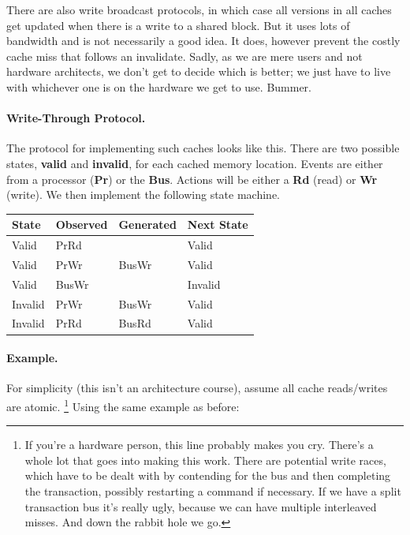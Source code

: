 \documentclass[a4paper]{report}
\begin{document}
There are also write broadcast protocols, in which case all versions in all caches get updated when there is a write to a shared block. But it uses lots of bandwidth and is not necessarily a good idea. It does, however prevent the costly cache miss that follows an invalidate. Sadly, as we are mere users and not hardware architects, we don't get to decide which is better; we just have to live with whichever one is on the hardware we get to use. Bummer.

\paragraph{Write-Through Protocol.}
The protocol for implementing such caches looks like this.
There are two possible states, {\bf valid} and {\bf invalid}, for each cached memory location.
Events are either from a processor ({\bf Pr}) or the {\bf Bus}. Actions will be either a \textbf{Rd} (read) or \textbf{Wr} (write).
We then implement the following state machine.

  \begin{center}
    \begin{tabular}{l|l|l|l}
      {\bf State} & {\bf Observed} & {\bf Generated} & {\bf Next State}\\ \hline
      Valid   & PrRd  &       & Valid\\
      Valid   & PrWr  & BusWr & Valid\\
      Valid   & BusWr &       & Invalid\\
      Invalid & PrWr  & BusWr & Valid\\
      Invalid & PrRd  & BusRd & Valid\\
    \end{tabular}
  \end{center}

\paragraph{Example.} For simplicity (this isn't an architecture course), assume all cache
      reads/writes are atomic. \footnote{If you're a hardware person, this line probably makes you cry. There's a whole lot that goes into making this work. There are potential write races, which have to be dealt with by contending for the bus and then completing the transaction, possibly restarting a command if necessary. If we have a split transaction bus it's really ugly, because we can have multiple interleaved misses. And down the rabbit hole we go.} Using the same example as before:
\end{document}
